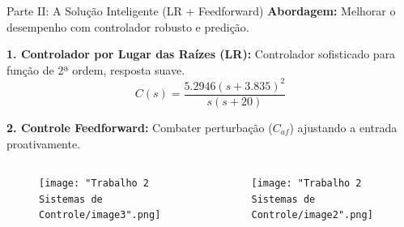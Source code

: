 \documentclass{beamer}
\begin{document}
\begin{frame}{Parte II: A Solução Inteligente (LR + Feedforward)}
    \normalsize \textbf{Abordagem:} Melhorar o desempenho com controlador robusto e predição.
    \vspace{0.01em}
    
    \scriptsize
    \textbf{1. Controlador por Lugar das Raízes (LR):} Controlador sofisticado para função de 2ª ordem, resposta suave.
    \tiny \[ C(s)=\frac{5.2946(s+3.835)^2}{s(s+20)} \]
    
    \vspace{0.01em}
    \scriptsize
    \textbf{2. Controle Feedforward:} Combater perturbação (\(C_{af}\)) ajustando a entrada proativamente.
    
    \begin{columns}[T]
        \begin{column}{0.5\textwidth}
            \begin{figure}
                \texttt{[image: "Trabalho 2 Sistemas de Controle/image3".png]}
            \end{figure}
        \end{column}
        \begin{column}{0.5\textwidth}
            \begin{figure}
                \texttt{[image: "Trabalho 2 Sistemas de Controle/image2".png]}
            \end{figure}
        \end{column}
    \end{columns}
    
\end{frame}
\end{document}
